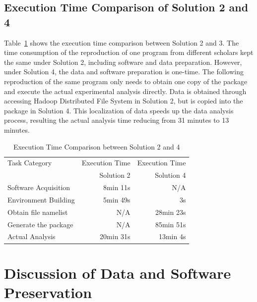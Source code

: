 \documentclass{acm_proc_article-sp}
\begin{document}
\subsection{Execution Time Comparison of Solution 2 and 4}

Table~\ref{table:time-2nd3rd} shows the execution time comparison between
Solution 2 and 3. The time consumption of the reproduction of one program from
different scholars kept the same under Solution 2, including software and data
preparation. However, under Solution 4, the data and software preparation is
one-time. The following reproduction of the same program only needs to obtain
one copy of the package and execute the actual experimental analysis directly.
Data is obtained through accessing Hadoop Distributed File System in Solution 2, but is copied into the package in Solution 4. This localization of data speeds up the data analysis process, resulting the actual analysis time reducing from 31 minutes to 13 minutes.

\begin{table}
    \centering
    \begin{tabular}{|l|r|r|}
    \hline
    Task Category & Execution Time & Execution Time \\
    & Solution 2 & Solution 4\\ \hline
    Software Acquisition & 8min 11s & N/A \\ \hline
    Environment Building & 5min 49s  & 3s \\ \hline
    Obtain file namelist & N/A & 28min 23s \\ \hline
    Generate the package & N/A & 85min 51s \\ \hline
    Actual Analysis & 20min 31s & 13min 4s \\ \hline
    \end{tabular}
    \caption{Execution Time Comparison between Solution 2 and 4}
    \label{table:time-2nd3rd}
\end{table}    

\section{Discussion of Data and Software Preservation}
\end{document}
